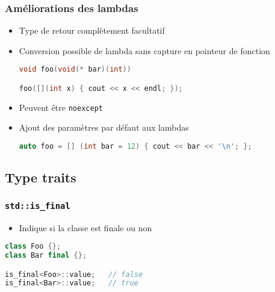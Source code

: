 \documentclass[C++.tex]{subfiles}
\begin{document}
\begin{frame}[fragile]
	\frametitle{Améliorations des lambdas}
	\begin{itemize}
		\item Type de retour complètement facultatif


		\item Conversion possible de lambda sans capture en pointeur de fonction


\begin{lstlisting}[language=C++]
void foo(void(* bar)(int))

foo([](int x) { cout << x << endl; });\end{lstlisting}

		\item Peuvent être \lstinline|noexcept|
		\item Ajout des paramètres par défaut aux lambdas

		\begin{lstlisting}[language=C++]
auto foo = [] (int bar = 12) { cout << bar << '\n'; };\end{lstlisting}
	\end{itemize}
\end{frame}

\subsection*{Type traits}
\begin{frame}[fragile]
	\frametitle{\lstinline|std::is_final|}
	\begin{itemize}
		\item Indique si la classe est finale ou non
	\end{itemize}

	\begin{lstlisting}[language=C++]
class Foo {};
class Bar final {};

is_final<Foo>::value;   // false
is_final<Bar>::value;   // true\end{lstlisting}
\end{frame}
\end{document}
